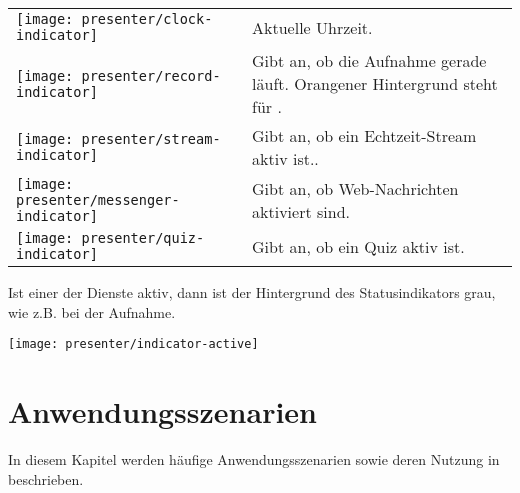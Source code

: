\begin{longtable}{p{1cm}p{12cm}}
	\begin{minipage}{.06\textwidth}
		\texttt{[image: presenter/clock-indicator]}
	\end{minipage}
	& Aktuelle Uhrzeit. \\
	\begin{minipage}{.06\textwidth}
		\texttt{[image: presenter/record-indicator]}
	\end{minipage}
	& Gibt an, ob die Aufnahme gerade läuft. Orangener Hintergrund steht für \quote{pausiert}. \\
	\begin{minipage}{.06\textwidth}
		\texttt{[image: presenter/stream-indicator]}
	\end{minipage}
	& Gibt an, ob ein Echtzeit-Stream aktiv ist.. \\
	\begin{minipage}{.06\textwidth}
		\texttt{[image: presenter/messenger-indicator]}
	\end{minipage}
	& Gibt an, ob Web-Nachrichten aktiviert sind. \\
	\begin{minipage}{.06\textwidth}
		\texttt{[image: presenter/quiz-indicator]}
	\end{minipage}
	& Gibt an, ob ein Quiz aktiv ist. \\
\end{longtable}

Ist einer der Dienste aktiv, dann ist der Hintergrund des Statusindikators grau, wie z.B. bei der Aufnahme.

\begin{minipage}{\textwidth}
	\centering
	\texttt{[image: presenter/indicator-active]}
	\label{fig:presenter-indicator-active}
\end{minipage}


\section{Anwendungsszenarien}
\label{section:presenter-use-cases}
In diesem Kapitel werden häufige Anwendungsszenarien sowie deren Nutzung in \lectPresenter{} beschrieben.


